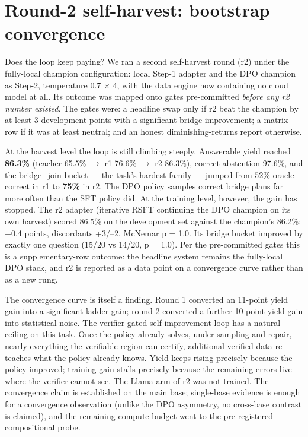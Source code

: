 \documentclass[10pt]{article} %
\begin{document}
\section{Round-2 self-harvest: bootstrap convergence}\label{sec:round-2-self-harvest-bootstrap-convergen}

Does the loop keep paying? We ran a second self-harvest round (r2) under the fully-local
champion configuration: local Step-1 adapter and the DPO champion as Step-2, temperature
0.7 $\times$ 4, with the data engine now containing no cloud model at all. Its outcome was mapped
onto gates pre-committed \emph{before any r2 number existed}. The gates were: a headline swap only
if r2 beat the champion by at least 3 development points with a significant bridge
improvement; a matrix row if it was at least neutral; and an honest diminishing-returns report
otherwise.

At the harvest level the loop is still climbing steeply. Answerable yield reached \textbf{86.3\%}
(teacher 65.5\% $\rightarrow$ r1 76.6\% $\rightarrow$ r2 86.3\%), correct abstention 97.6\%, and the bridge\_join bucket ---
the task's hardest family --- jumped from 52\% oracle-correct in r1 to \textbf{75\%} in r2. The DPO
policy samples correct bridge plans far more often than the SFT policy did. At the training
level, however, the gain has stopped. The r2 adapter (iterative RSFT continuing the DPO
champion on its own harvest) scored 86.5\% on the development set against the champion's 86.2\%:
+0.4 points, discordants +3/--2, McNemar p = 1.0. Its bridge bucket improved by exactly one
question (15/20 vs 14/20, p = 1.0). Per the pre-committed gates this is a supplementary-row
outcome: the headline system remains the fully-local DPO stack, and r2 is reported as a data
point on a convergence curve rather than as a new rung.

The convergence curve is itself a finding. Round 1 converted an 11-point yield gain into a
significant ladder gain; round 2 converted a further 10-point yield gain into statistical
noise. The verifier-gated self-improvement loop has a natural ceiling on this task. Once the
policy already solves, under sampling and repair, nearly everything the verifiable region can
certify, additional verified data re-teaches what the policy already knows. Yield keeps rising
precisely because the policy improved; training gain stalls precisely because the remaining
errors live where the verifier cannot see. The Llama arm of r2 was not trained. The
convergence claim is established on the main base; single-base evidence is enough for a
convergence observation (unlike the DPO asymmetry, no cross-base contrast is claimed), and the
remaining compute budget went to the pre-registered compositional probe.
\end{document}
